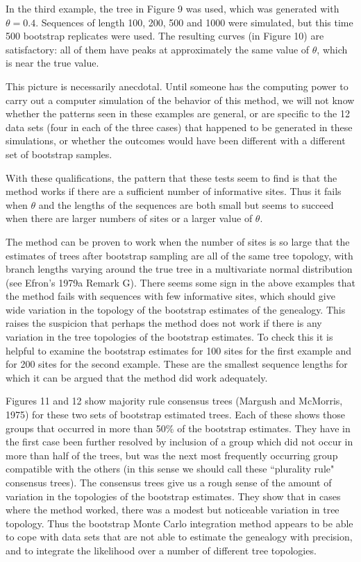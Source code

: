 In the third example, the tree in Figure 9 was used, which was generated
with $\theta = 0.4$.  Sequences of length 100, 200, 500 and 1000 were
simulated, but this time 500 bootstrap replicates were used.  The resulting
curves (in Figure 10) are satisfactory: all of them have peaks at approximately the
same value of $\theta$, which is near the true value.

This picture is necessarily anecdotal.  Until someone has the computing power
to carry out a computer simulation of the behavior of this method, we will not
know whether the patterns seen in these examples are general, or are
specific to the 12 data sets (four in each of the three cases) that happened
to be generated in these simulations, or whether the outcomes would have been
different with a different set of bootstrap samples.

With these qualifications, the pattern that these tests seem to find is
that the method works if there are a sufficient number of informative
sites.  Thus it fails when $\theta$ and the lengths of the sequences are
both small but seems to succeed when there are larger numbers of sites or
a larger value of $\theta$.
  
The method can be proven to work when the number of sites is so large that
the estimates of trees after bootstrap sampling are all of the same tree
topology, with branch lengths varying around the true tree in a multivariate
normal distribution (see Efron's 1979a Remark G).  There seems some sign
in the above examples that the method fails with sequences with few
informative sites, which should give wide variation in the topology
of the bootstrap estimates of the genealogy.  This raises the suspicion
that perhaps the method does not work if there is any variation in the
tree topologies of the bootstrap estimates.  To check this it is helpful
to examine the bootstrap estimates for 100 sites for the first example and for
200 sites for the second example.  These are the smallest sequence lengths for
which it can
be argued that the method did work adequately.

Figures 11 and 12 show majority rule consensus trees (Margush and McMorris, 1975)
for these two sets of bootstrap estimated trees.  Each of these shows those
groups that occurred in more than 50\% of the bootstrap estimates.  They have
in the first case been further resolved by inclusion of a group which did
not occur in more than half of the trees, but was the next most frequently
occurring group compatible with the others (in this sense we should call
these ``plurality rule" consensus trees).  The consensus trees give us a rough
sense of the amount of variation in the topologies of the bootstrap estimates.
They show that in cases where the method worked, there was a modest but
noticeable variation in tree topology.  Thus the bootstrap Monte Carlo
integration method appears to be able to cope with data sets that are not
able to estimate the genealogy with precision, and to integrate the likelihood
over a number of different tree topologies.
\bigskip

